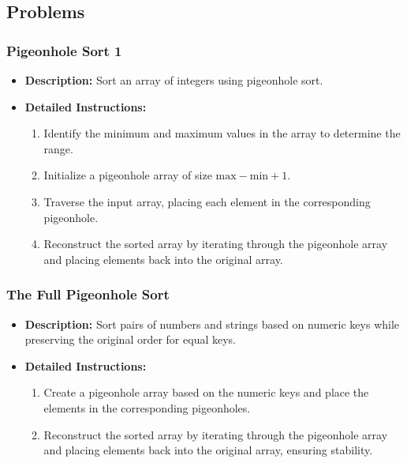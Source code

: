 \subsection{Problems}

\subsubsection{Pigeonhole Sort 1}
\begin{itemize}
    \item \textbf{Description:} Sort an array of integers using pigeonhole sort.
    \item \textbf{Detailed Instructions:}
    \begin{enumerate}
        \item Identify the minimum and maximum values in the array to determine the range.
        \item Initialize a pigeonhole array of size \(\text{max} - \text{min} + 1\).
        \item Traverse the input array, placing each element in the corresponding pigeonhole.
        \item Reconstruct the sorted array by iterating through the pigeonhole array and placing elements back into the original array.
    \end{enumerate}
\end{itemize}

\subsubsection{The Full Pigeonhole Sort}
\begin{itemize}
    \item \textbf{Description:} Sort pairs of numbers and strings based on numeric keys while preserving the original order for equal keys.
    \item \textbf{Detailed Instructions:}
    \begin{enumerate}
        \item Create a pigeonhole array based on the numeric keys and place the elements in the corresponding pigeonholes.
        \item Reconstruct the sorted array by iterating through the pigeonhole array and placing elements back into the original array, ensuring stability.
    \end{enumerate}
\end{itemize}

